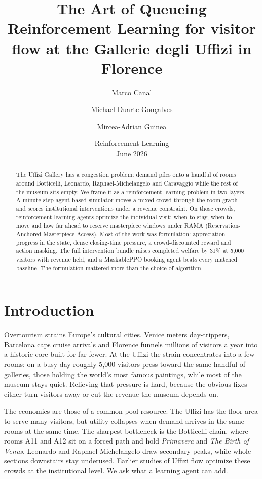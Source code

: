 \documentclass[11pt]{article}
\title{\textbf{The Art of Queueing}\\
\large Reinforcement Learning for visitor flow at the Gallerie degli Uffizi in Florence}
\author{Marco Canal \and Michael Duarte Gon\c{c}alves \and Mircea-Adrian Guinea}
\date{Reinforcement Learning \\ June 2026}
\numberwithin{equation}{section} %
\begin{document}
\maketitle

\begin{abstract}
The Uffizi Gallery has a congestion problem: demand piles onto a handful of rooms around Botticelli,
Leonardo, Raphael-Michelangelo and Caravaggio while the rest of the museum sits empty. We frame it as a
reinforcement-learning problem in two layers. A minute-step agent-based simulator moves a mixed crowd
through the room graph and scores institutional interventions under a revenue constraint. On those crowds,
reinforcement-learning agents optimize the individual visit: when to stay, when to move and how far ahead to
reserve masterpiece windows under RAMA (Reservation-Anchored Masterpiece Access). Most of the work was
formulation: appreciation progress in the state, dense closing-time pressure, a crowd-discounted reward and
action masking. The full intervention bundle raises completed welfare by 31\% at 5,000 visitors with revenue
held, and a MaskablePPO booking agent beats every matched baseline. The formulation mattered more than the
choice of algorithm.
\end{abstract}

\section{Introduction}

Overtourism strains Europe's cultural cities. Venice meters day-trippers, Barcelona caps cruise arrivals and
Florence funnels millions of visitors a year into a historic core built for far fewer. At the Uffizi the
strain concentrates into a few rooms: on a busy day roughly 5,000 visitors press toward the same handful of
galleries, those holding the world's most famous paintings, while most of the museum stays quiet. Relieving
that pressure is hard, because the obvious fixes either turn visitors away or cut the revenue the museum
depends on.

The economics are those of a common-pool resource. The Uffizi has the floor area to serve many visitors, but
utility collapses when demand arrives in the same rooms at the same time. The sharpest bottleneck is the
Botticelli chain, where rooms A11 and A12 sit on a forced path and hold \emph{Primavera} and \emph{The Birth
of Venus}. Leonardo and Raphael-Michelangelo draw secondary peaks, while whole sections downstairs stay
underused. Earlier studies of Uffizi flow \citep{attanasio2022,centorrino2021} optimize these crowds at the
institutional level. We ask what a learning agent can add.
\end{document}
